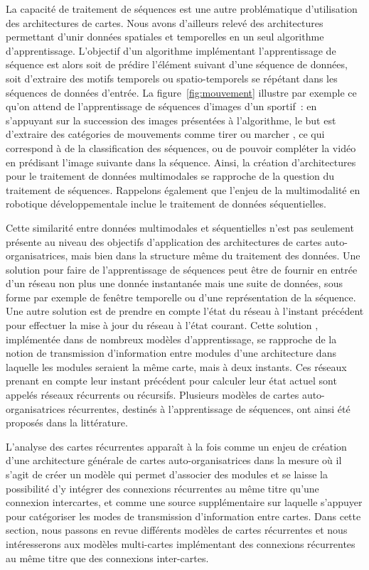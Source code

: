 \documentclass[../main]{subfiles}
\begin{document}
La capacité de traitement de séquences est une autre problématique d'utilisation des architectures de cartes. Nous avons d'ailleurs relevé des architectures permettant d'unir données spatiales et temporelles en un seul algorithme d'apprentissage. L'objectif d'un algorithme implémentant l'apprentissage de séquence est alors soit de prédire l'élément suivant d'une séquence de données, soit d'extraire des motifs temporels ou spatio-temporels se répétant dans les séquences de données d'entrée. 
La figure~\ref{fig:mouvement} illustre par exemple ce qu'on attend de l'apprentissage de séquences d'images d'un sportif~: en s'appuyant sur la succession des images présentées à l'algorithme, le but est d'extraire des catégories de mouvements comme \og tirer \fg{} ou \og marcher \fg{}, ce qui correspond à de la classification des séquences, ou de pouvoir compléter la vidéo en prédisant l'image suivante dans la séquence.
Ainsi, la création d'architectures pour le traitement de données multimodales se rapproche de la question du traitement de séquences. Rappelons également que l'enjeu de la multimodalité en robotique développementale inclue le traitement de données séquentielles.


Cette similarité entre données multimodales et séquentielles n'est pas seulement présente au niveau des objectifs d'application des architectures de cartes auto-organisatrices, mais bien dans la structure même du traitement des données. 
Une solution pour faire de l'apprentissage de séquences peut être de fournir en entrée d'un réseau non plus une donnée instantanée mais une suite de données, sous forme par exemple de fenêtre temporelle ou d'une représentation de la séquence.
Une autre solution est de prendre en compte l'état du réseau à l'instant précédent pour effectuer la mise à jour du réseau à l'état courant. 
Cette solution , implémentée dans de nombreux modèles d'apprentissage, se rapproche de la notion de transmission d'information entre modules d'une architecture dans laquelle les modules seraient la même carte, mais à deux instants. Ces réseaux prenant en compte leur instant précédent pour calculer leur état actuel sont appelés réseaux récurrents ou récursifs.
Plusieurs modèles de cartes auto-organisatrices récurrentes, destinés à l'apprentissage de séquences, ont ainsi été proposés dans la littérature.

L'analyse des cartes récurrentes apparaît à la fois comme un enjeu de création d'une architecture générale de cartes auto-organisatrices dans la mesure où il s'agit de créer un modèle qui permet d'associer des modules et se laisse la possibilité d'y intégrer des connexions récurrentes au même titre qu'une connexion intercartes, et comme une source supplémentaire sur laquelle s'appuyer pour catégoriser les modes de transmission d'information entre cartes. Dans cette section, nous passons en revue différents modèles de cartes récurrentes et nous intéresserons aux modèles multi-cartes implémentant des connexions récurrentes au même titre que des connexions inter-cartes.
\end{document}
